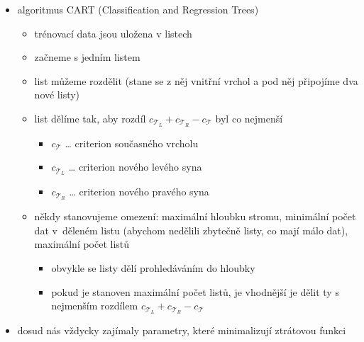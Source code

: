 \begin{itemize}
\begin{itemize}
\begin{itemize}
\begin{itemize}
\item v binární klasifikaci Gini odpovídá squared error ztrátové funkci (skoro MSE)
\end{itemize}
\item entropy criterion (používá se při klasifikaci)
\begin{itemize}
\item $c_\text{entropy}(\mathcal T)=|I_\mathcal T|\cdot H(p_\mathcal T)=-|I_\mathcal T|\sum_k p_\mathcal T(k)\log p_\mathcal T(k)$
\item ze součtu vynecháme třídy s nulovou pravděpodobností, aby nám nerozbily logaritmus
\item entropy criterion lze odvodit ze ztrátové funkce negative log likelihood (NLL)
\end{itemize}
\end{itemize}
\item algoritmus CART (Classification and Regression Trees)
\begin{itemize}
\item trénovací data jsou uložena v listech 
\item začneme s jedním listem
\item list můžeme rozdělit (stane se z něj vnitřní vrchol a pod něj připojíme dva nové listy)
\item list dělíme tak, aby rozdíl $c_{\mathcal T_L}+c_{\mathcal T_R}-c_{\mathcal T}$ byl co nejmenší
\begin{itemize}
\item $c_\mathcal T$ \dots{} criterion současného vrcholu
\item $c_{\mathcal T_L}$ \dots{} criterion nového levého syna
\item $c_{\mathcal T_R}$ \dots{} criterion nového pravého syna
\end{itemize}
\item někdy stanovujeme omezení: maximální hloubku stromu, minimální počet dat v~děleném listu (abychom nedělili zbytečně listy, co mají málo dat), maximální počet listů
\begin{itemize}
\item obvykle se listy dělí prohledáváním do hloubky
\item pokud je stanoven maximální počet listů, je vhodnější je dělit ty s nejmenším rozdílem $c_{\mathcal T_L}+c_{\mathcal T_R}-c_{\mathcal T}$
\end{itemize}
\end{itemize}
\item dosud nás vždycky zajímaly parametry, které minimalizují ztrátovou funkci

\end{itemize}
\end{itemize}

